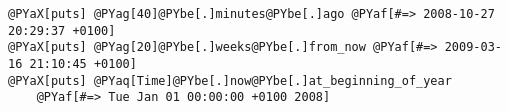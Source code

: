 \begin{Verbatim}[commandchars=@\[\]]
@PYaX[puts] @PYag[40]@PYbe[.]minutes@PYbe[.]ago @PYaf[#=> 2008-10-27 20:29:37 +0100]
@PYaX[puts] @PYag[20]@PYbe[.]weeks@PYbe[.]from_now @PYaf[#=> 2009-03-16 21:10:45 +0100]
@PYaX[puts] @PYaq[Time]@PYbe[.]now@PYbe[.]at_beginning_of_year
	@PYaf[#=> Tue Jan 01 00:00:00 +0100 2008]
\end{Verbatim}
